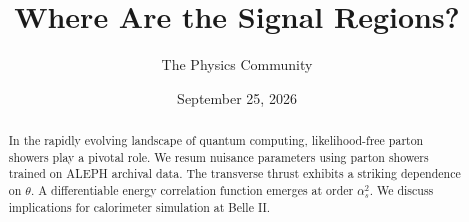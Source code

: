 \documentclass[11pt]{article}
\title{Where Are the Signal Regions?}
\author{The Physics Community}
\date{September 25, 2026}
\numberwithin{equation}{section}
\theoremstyle{definition}
\theoremstyle{remark}
\begin{document}
\maketitle
\begin{abstract}
In the rapidly evolving landscape of quantum computing, likelihood-free
parton showers play a pivotal role. We resum nuisance parameters using
parton showers trained on ALEPH archival data. The transverse thrust
exhibits a striking dependence on $\theta$. A differentiable energy
correlation function emerges at order $\alpha_s^2$. We discuss
implications for calorimeter simulation at Belle II.
\end{abstract}
\tableofcontents



\nocite{*}


\end{document}
